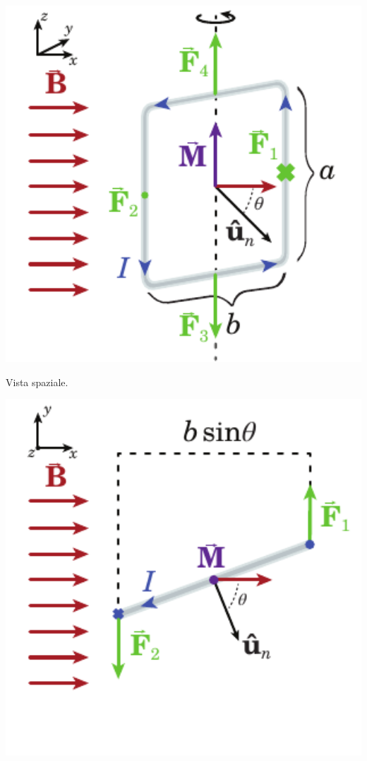 \begin{center}
	\begin{minipage}{0.49\textwidth}
		\begin{center}
			\includegraphics[width=1\textwidth]{images/chp7/chp7momentospira1.pdf}
		\end{center}
	\begin{center}
		{\scriptsize Vista spaziale.}
	\end{center}
	\end{minipage}
	\begin{minipage}{0.49\textwidth}
		\begin{center}
			\includegraphics[width=1\textwidth]{images/chp7/chp7momentospira2.pdf}

\end{center}
\end{minipage}
\end{center}
